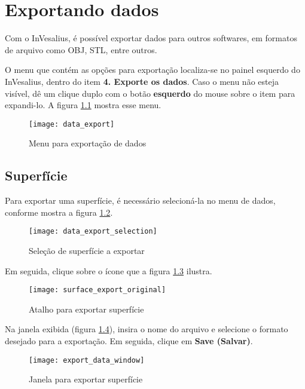 \chapter{Exportando dados}

Com o InVesalius, é possível exportar dados para outros softwares, em formatos de arquivo
como OBJ, STL, entre outros.

O menu que contém as opções para exportação localiza-se no painel esquerdo do InVesalius,
dentro do item \textbf{4. Exporte os dados}. Caso o menu não esteja visível, dê um clique
duplo com o botão \textbf{esquerdo} do mouse sobre o item para expandi-lo. A figura
\ref{fig:data_export} mostra esse menu.

\begin{figure}[!htb]
\centering
\texttt{[image: data\_export]}
\caption{Menu para exportação de dados}
\label{fig:data_export}
\end{figure}

\section{Superfície}

Para exportar uma superfície, é necessário selecioná-la no menu de dados, conforme mostra a
figura \ref{fig:data_export_selection}.

\newpage

\begin{figure}[!htb]
\centering
\texttt{[image: data\_export\_selection]}
\caption{Seleção de superfície a exportar}
\label{fig:data_export_selection}
\end{figure}

Em seguida, clique sobre o ícone que a figura \ref{fig:surface_export_original} ilustra.

\begin{figure}[!htb]
\centering
\texttt{[image: surface\_export\_original]}
\caption{Atalho para exportar superfície}
\label{fig:surface_export_original}
\end{figure}

Na janela exibida (figura \ref{fig:export_data_window}), insira o nome do arquivo e
selecione o formato desejado para a exportação. Em seguida, clique em \textbf{Save (Salvar)}.


\begin{figure}[!htb]
\centering
\texttt{[image: export\_data\_window]}
\caption{Janela para exportar superfície}
\label{fig:export_data_window}
\end{figure}

